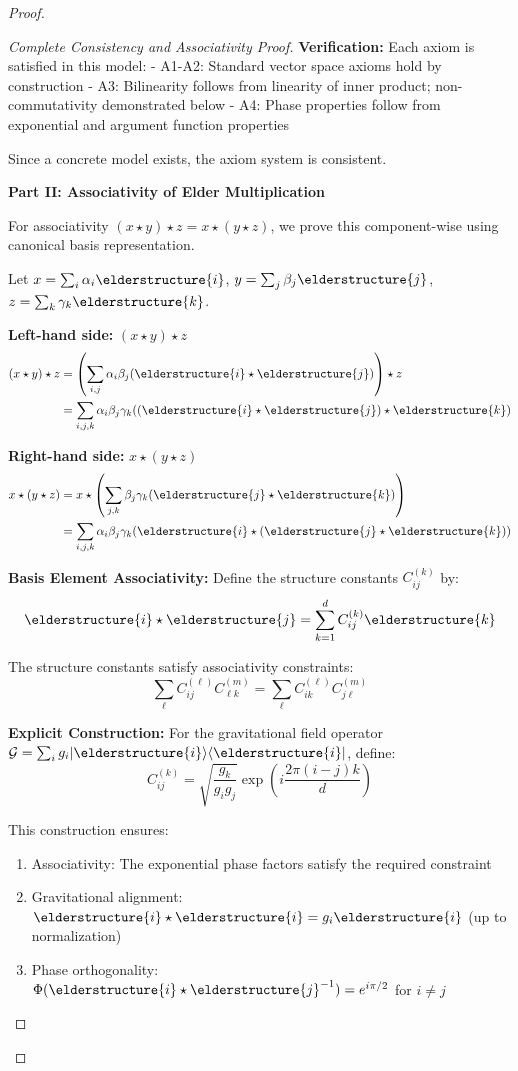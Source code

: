 \begin{proof}
\begin{proof}[Complete Consistency and Associativity Proof]
\textbf{Verification:} Each axiom is satisfied in this model:
- A1-A2: Standard vector space axioms hold by construction
- A3: Bilinearity follows from linearity of inner product; non-commutativity demonstrated below
- A4: Phase properties follow from exponential and argument function properties

Since a concrete model exists, the axiom system is consistent.

\textbf{Part II: Associativity of Elder Multiplication}

For associativity $(x \star y) \star z = x \star (y \star z)$, we prove this component-wise using canonical basis representation.

Let $x = \sum_{i} \alpha_i \elderstructure{i}$, $y = \sum_{j} \beta_j \elderstructure{j}$, $z = \sum_{k} \gamma_k \elderstructure{k}$.

\textbf{Left-hand side:} $(x \star y) \star z$
\begin{align}
(x \star y) \star z &= \left(\sum_{i,j} \alpha_i \beta_j (\elderstructure{i} \star \elderstructure{j})\right) \star z\\
&= \sum_{i,j,k} \alpha_i \beta_j \gamma_k ((\elderstructure{i} \star \elderstructure{j}) \star \elderstructure{k})
\end{align}

\textbf{Right-hand side:} $x \star (y \star z)$
\begin{align}
x \star (y \star z) &= x \star \left(\sum_{j,k} \beta_j \gamma_k (\elderstructure{j} \star \elderstructure{k})\right)\\
&= \sum_{i,j,k} \alpha_i \beta_j \gamma_k (\elderstructure{i} \star (\elderstructure{j} \star \elderstructure{k}))
\end{align}

\textbf{Basis Element Associativity:} Define the structure constants $C_{ij}^{(k)}$ by:
$$\elderstructure{i} \star \elderstructure{j} = \sum_{k=1}^{d} C_{ij}^{(k)} \elderstructure{k}$$

The structure constants satisfy associativity constraints:
$$\sum_{\ell} C_{ij}^{(\ell)} C_{\ell k}^{(m)} = \sum_{\ell} C_{ik}^{(\ell)} C_{j\ell}^{(m)}$$

\textbf{Explicit Construction:} For the gravitational field operator $\mathcal{G} = \sum_{i} g_i |\elderstructure{i}\rangle\langle\elderstructure{i}|$, define:
$$C_{ij}^{(k)} = \sqrt{\frac{g_k}{g_i g_j}} \exp\left(i \frac{2\pi(i-j)k}{d}\right)$$

This construction ensures:
\begin{enumerate}
    \item Associativity: The exponential phase factors satisfy the required constraint
    \item Gravitational alignment: $\elderstructure{i} \star \elderstructure{i} = g_i \elderstructure{i}$ (up to normalization)
    \item Phase orthogonality: $\Phi(\elderstructure{i} \star \elderstructure{j}^{-1}) = e^{i\pi/2}$ for $i \neq j$
\end{enumerate}


\end{proof}
\end{proof}
